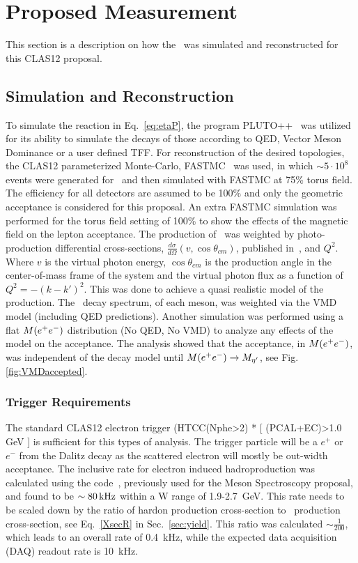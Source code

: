 \section{Proposed Measurement}\label{sec:measurement}
This section is a description on how the \etaDal \ was simulated and reconstructed for this CLAS12 proposal.
\subsection{Simulation and Reconstruction}
To simulate the reaction in Eq.~\ref{eq:etaP}, the program PLUTO++~\cite{PLUTO} was utilized for its ability to simulate the decays of those according to QED, Vector Meson Dominance or a user defined TFF. For reconstruction of the desired topologies, the CLAS12 parameterized Monte-Carlo, FASTMC~\cite{fastmc} was used, in which $\sim 5\cdot10^8$ events were generated for \etaPDal \ and then simulated with FASTMC at 75\% torus field. The efficiency for all detectors are assumed to be 100\% and only the geometric acceptance is considered for this proposal. An extra FASTMC simulation was performed for the torus field setting of 100\% to show the effects of the magnetic field on the lepton acceptance.
 \newline
\indent The production of \etaTP \ was weighted by photo-production differential cross-sections, $\frac{d\sigma}{d\Omega}(v,\cos\theta_{cm})$, published in~\cite{Williams}, and $Q^2$. Where $v$ is the virtual photon energy, $\cos\theta_{cm}$ is the production angle in the center-of-mass frame of the system and the virtual photon flux as a function of $Q^2 = -(k-k')^2$. This was done to achieve a quasi realistic model of the production. The \epemT \  decay spectrum, of each meson, was weighted via the VMD model (including QED predictions). Another simulation was performed using a flat $M(e^+e^-)$ distribution (No QED, No VMD) to analyze any effects of the model on the \epemT acceptance. The analysis showed that the acceptance, in $M(e^+e^-)$, was independent of the decay model until $M(e^+e^-)\to M_{\eta^{\prime}} $, see Fig.\ref{fig:VMDaccepted}.
\subsubsection{Trigger Requirements}
The standard CLAS12 electron trigger (HTCC(Nphe>2) * [ (PCAL+EC)>1.0 GeV ] is sufficient for this types of analysis. The trigger particle will be a $e^+$ or $e^-$ from the Dalitz decay as the scattered electron will mostly be out-width acceptance. The inclusive rate for electron induced hadroproduction was calculated using the code~\cite{Sargsyan}, previously used for the Meson Spectroscopy proposal, and found to be $\sim 80\,\rm{kHz}$ within a W range of 1.9-2.7~GeV. This rate needs to be scaled down by the ratio of hardon production cross-section to \etaTP \ production cross-section, see Eq.~\ref{XsecR} in Sec.~\ref{sec:yield}. This ratio was calculated $\sim\frac{1}{200}$, which leads to an overall rate of 0.4~kHz, while the expected data acquisition (DAQ) readout rate is 10~kHz.
